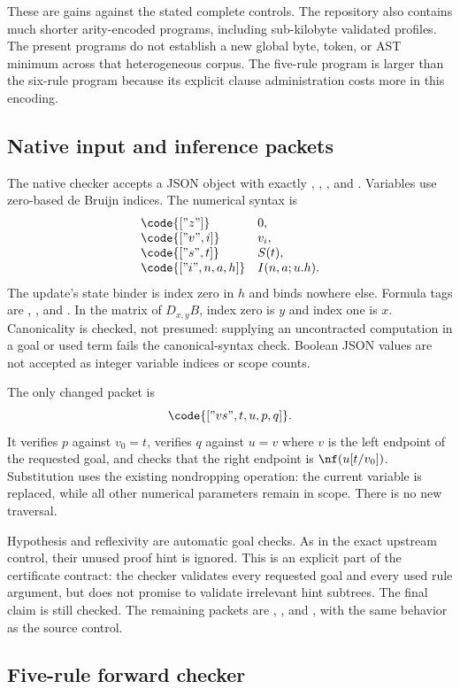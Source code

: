 These are gains against the stated complete controls. The repository also
contains much shorter arity-encoded programs, including sub-kilobyte
validated profiles. The present programs do not establish a new global
byte, token, or AST minimum across that heterogeneous corpus.
The five-rule program is larger than the six-rule program because its
explicit clause administration costs more in this encoding.

\subsection{Native input and inference packets}

The native checker accepts a JSON object with exactly
, , , and .
Variables use zero-based de Bruijn indices. The numerical syntax is
\[
\begin{array}{ll}
\code{["z"]}&0,\\
\code{["v",i]}&v_i,\\
\code{["s",t]}&S(t),\\
\code{["i",n,a,h]}&I(n,a;u.h).
\end{array}
\]
The update's state binder is index zero in $h$ and binds nowhere else.
Formula tags are , , and .
In the matrix of $D_{x,y}B$, index zero is $y$ and index one is $x$.
Canonicality is checked, not presumed: supplying an uncontracted
computation in a goal or used term fails the canonical-syntax check.
Boolean JSON values are not accepted as integer variable indices or scope
counts.

The only changed packet is
\[
 \code{["vs",t,u,p,q]}.
\]
It verifies $p$ against $v_0=t$, verifies $q$ against $u=v$ where $v$
is the left endpoint of the requested goal, and checks that the right
endpoint is $\nf(u[t/v_0])$. Substitution uses the existing nondropping
operation: the current variable is replaced, while all other numerical
parameters remain in scope. There is no new traversal.

Hypothesis and reflexivity are automatic goal checks. As in the exact
upstream control, their unused proof hint is ignored. This is an explicit
part of the certificate contract: the checker validates every requested
goal and every used rule argument, but does not promise to validate
irrelevant hint subtrees. The final claim is still checked.
The remaining packets are , , and , with
the same behavior as the source control.

\subsection{Five-rule forward checker}

